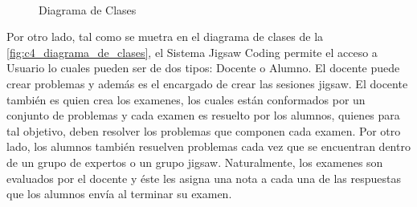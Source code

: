\documentclass[twoside]{article}
\begin{document}
\begin{multicols}{2}
\begin{figure}[H]
	\centering
	\\
	\caption{Diagrama de Clases}\label{fig:c4_diagrama_de_clases}
\end{figure}

Por otro lado, tal como se muetra en el diagrama de clases de la \autoref{fig:c4_diagrama_de_clases}, el Sistema Jigsaw Coding permite el acceso a Usuario lo cuales pueden ser de dos tipos: Docente o Alumno. El docente puede crear problemas y además es el encargado de crear las sesiones jigsaw. El docente también es quien crea los examenes, los cuales están conformados por un conjunto de problemas y cada examen es resuelto por los alumnos, quienes para tal objetivo, deben resolver los problemas que componen cada examen. Por otro lado, los alumnos también resuelven problemas cada vez que se encuentran dentro de un grupo de expertos o un grupo jigsaw. Naturalmente, los examenes son evaluados por el docente y éste les asigna una nota a cada una de las respuestas que los alumnos envía al terminar su examen.\\


\end{multicols}
\end{document}
